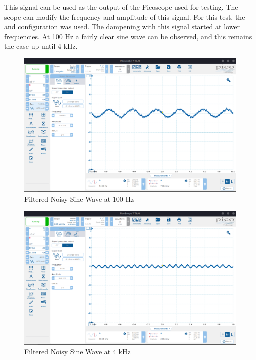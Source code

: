 This signal can be used as the output of the Picoscope used for testing. The scope can modify the frequency and amplitude of this signal. For this test, the  and  configuration was used. The dampening with this signal started at lower frequencies. At 100 Hz a fairly clear sine wave can be observed, and this remains the case up until 4 kHz.

\begin{figure}[H]
    \centering
    \includegraphics[width=150mm, keepaspectratio]{figures/filter100.png}
    \caption{Filtered Noisy Sine Wave at 100 Hz}
    \label{fig:filter100}
\end{figure}

\begin{figure}[H]
    \centering
    \includegraphics[width=150mm, keepaspectratio]{figures/filter4.png}
    \caption{Filtered Noisy Sine Wave at 4 kHz}
    \label{fig:filter4}
\end{figure}

